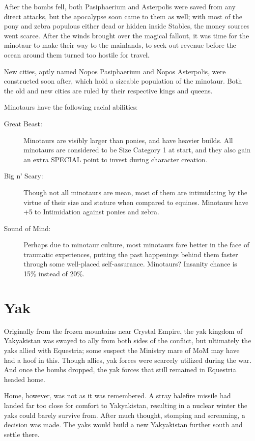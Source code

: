 \documentclass[11pt,a4paper,twocolumn]{book}
\begin{document}
	After the bombs fell, both Pasiphaerium and Asterpolis were saved from any direct attacks, but the apocalypse soon came to them as well; with most of the pony and zebra populous either dead or hidden inside Stables, the money sources went scarce. After the winds brought over the magical fallout, it was time for the minotaur to make their way to the mainlands, to seek out revenue before the ocean around them turned too hostile for travel.
	
	New cities, aptly named Nopos Pasiphaerium and Nopos Asterpolis, were constructed soon after, which hold a sizeable population of the minotaur. Both the old and new cities are ruled by their respective kings and queens.
	
	Minotaurs have the following racial abilities:
	\begin{description}
		\item[Great Beast:] Minotaurs are visibly larger than ponies, and have heavier builds. All minotaurs are considered to be Size Category 1 at start, and they also gain an extra SPECIAL point to invest during character creation.
		\item[Big n' Scary:] Though not all minotaurs are mean, most of them are intimidating by the virtue of their size and stature when compared to equines. Minotaurs have +5 to Intimidation against ponies and zebra.
		\item[Sound of Mind:] Perhaps due to minotaur culture, most minotaurs fare better in the face of traumatic experiences, putting the past happenings behind them faster through some well-placed self-assurance. Minotaurs? Insanity chance is 15\% instead of 20\%.
	\end{description}

	\clearpage
	
	\section*{Yak}
	
	Originally from the frozen mountains near Crystal Empire, the yak kingdom of Yakyakistan was swayed to ally from both sides of the conflict, but ultimately the yaks allied with Equestria; some suspect the Ministry mare of MoM may have had a hoof in this. Though allies, yak forces were scarcely utilized during the war. And once the bombs dropped, the yak forces that still remained in Equestria headed home.
	
	Home, however, was not as it was remembered. A stray balefire missile had landed far too close for comfort to Yakyakistan, resulting in a nuclear winter the yaks could barely survive from. After much thought, stomping and screaming, a decision was made. The yaks would build a new Yakyakistan further south and settle there.
	
\end{document}

